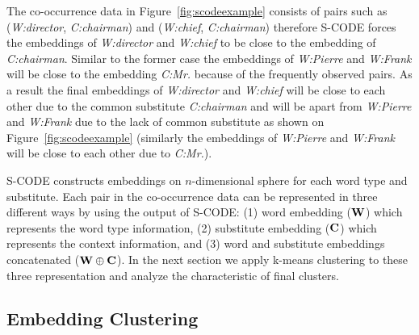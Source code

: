 
The co-occurrence data in Figure~\ref{fig:scodeexample} consists of
pairs such as (\textit{W:director}, \textit{C:chairman}) and
(\textit{W:chief}, \textit{C:chairman}) therefore S-CODE forces the
embeddings of \textit{W:director} and \textit{W:chief} to be close to
the embedding of \textit{C:chairman}.  Similar to the former case the
embeddings of \textit{W:Pierre} and \textit{W:Frank} will be close to
the embedding \textit{C:Mr.} because of the frequently observed pairs.
As a result the final embeddings of \textit{W:director} and
\textit{W:chief} will be close to each other due to the common
substitute \textit{C:chairman} and will be apart from
\textit{W:Pierre} and \textit{W:Frank} due to the lack of common
substitute as shown on Figure~\ref{fig:scodeexample} (similarly the
embeddings of \textit{W:Pierre} and \textit{W:Frank} will be close to
each other due to \textit{C:Mr.}).

S-CODE constructs embeddings on $n$-dimensional sphere for each word
type and substitute.  Each pair in the co-occurrence data can be
represented in three different ways by using the output of S-CODE: (1)
word embedding (${\bf W}$) which represents the word type information,
(2) substitute embedding (${\bf C}$) which represents the context
information, and (3) word and substitute embeddings concatenated
(${\bf W}\oplus{\bf C}$).  In the next section we apply k-means
clustering to these three representation and analyze the
characteristic of final clusters.

\subsection{Embedding Clustering}
\label{sec:clustering}

